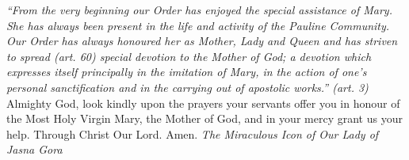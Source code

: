 \pagestyle{empty}
\hspace{0pt}
\vfill

\textit{``From the very beginning our Order has enjoyed
the special assistance of Mary. She has always been present
in the life and activity of the Pauline Community. Our Order
has always honoured her as Mother, Lady and Queen and
has striven to spread (art. 60) special devotion to the
Mother of God; a devotion which expresses itself principally
in the imitation of Mary, in the action of one's personal
sanctification and in the carrying out of apostolic
works.'' (art. 3)}
\medbreak
Almighty God, look kindly upon the prayers your
servants offer you in honour of the Most Holy Virgin Mary,
the Mother of God, and in your mercy grant us your help.
Through Christ Our Lord. Amen.
\vfill
\textit{The Miraculous Icon of Our Lady of Jasna Gora}
\hspace{0pt}
\newpage
